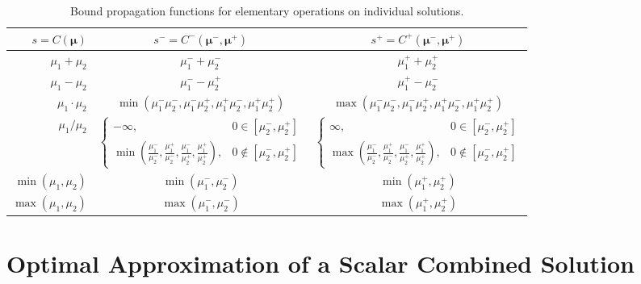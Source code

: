 \documentclass[graybox]{svmult}
\begin{document}
\begin{table}[t]
\begin{tabular}{r  c  c}
    $s=C(\boldsymbol{\mu})$ & $s^- = C^-(\boldsymbol{\mu}^-,\boldsymbol{\mu}^+)$ & $s^+ = C^+(\boldsymbol{\mu}^-,\boldsymbol{\mu}^+)$ \\
    \hline
    $\mu_1+\mu_2$ & $\mu_1^-+\mu_2^-$ & $\mu_1^++\mu_2^+$ \\
    $\mu_1-\mu_2$ & $\mu_1^--\mu_2^+$ & $\mu_1^+-\mu_2^-$ \\
    $\mu_1 \cdot \mu_2$ & $\min(\mu_1^-\mu_2^-,\mu_1^-\mu_2^+,\mu_1^+\mu_2^-,\mu_1^+\mu_2^+)$ & $\max(\mu_1^-\mu_2^-,\mu_1^-\mu_2^+,\mu_1^+\mu_2^-,\mu_1^+\mu_2^+)$ \\
    $\mu_1 / \mu_2$ & $\begin{cases} -\infty, & 0 \in [\mu_2^-,\mu_2^+] \\ \min\left(\frac{\mu_1^-}{\mu_2^-},\frac{\mu_1^+}{\mu_2^-},\frac{\mu_1^-}{\mu_2^+},\frac{\mu_1^+}{\mu_2^+}\right), & 0 \notin [\mu_2^-,\mu_2^+] \end{cases}$ & $\begin{cases} \infty, & 0 \in [\mu_2^-,\mu_2^+] \\ \max\left(\frac{\mu_1^-}{\mu_2^-},\frac{\mu_1^+}{\mu_2^-},\frac{\mu_1^-}{\mu_2^+},\frac{\mu_1^+}{\mu_2^+}\right), & 0 \notin [\mu_2^-,\mu_2^+] \end{cases}$ \\
    $\min(\mu_1,\mu_2)$ & $\min(\mu_1^-,\mu_2^-)$ & $\min(\mu_1^+,\mu_2^+)$ \\
    $\max(\mu_1,\mu_2)$ & $\max(\mu_1^-,\mu_2^-)$ & $\max(\mu_1^+,\mu_2^+)$ \\
    \hline
\end{tabular}
\caption{Bound propagation functions for elementary operations on individual solutions.}
\label{table:elementary_ops_Cpm}
\end{table}

\section{Optimal Approximation of a Scalar Combined Solution} \label{sec:opt_comb_sol_sc}
\end{document}
